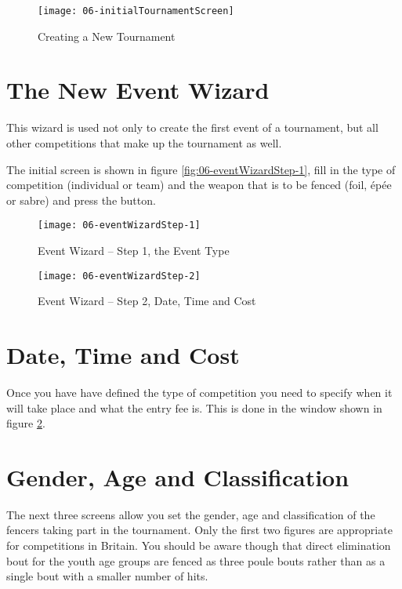 \documentclass[a4paper,11pt]{memoir}
\begin{document}
\begin{figure}
 \centering
 \texttt{[image: 06-initialTournamentScreen]}
 \caption{Creating a New Tournament} \label{fig:06-initialTournamentScreen}
\end{figure}

\section{The New Event Wizard}

This wizard is used not only to create the first event of a tournament, but all other competitions that make up the tournament as well.

The initial screen is shown in figure \ref{fig:06-eventWizardStep-1}, fill in the type of competition (individual or team) and the weapon that is to be fenced (foil, épée or sabre) and press the  button.

\begin{figure}[!ht]
 \centering
 \begin{minipage}{0.4\textwidth}
  \centering
  \texttt{[image: 06-eventWizardStep-1]}
  \caption{Event Wizard -- Step 1, the Event Type} \label{fig:06-eventWizardStep-1}
\end{minipage}
\hfill
 \begin{minipage}{0.4\textwidth}
  \centering
  \texttt{[image: 06-eventWizardStep-2]}
  \caption{Event Wizard -- Step 2, Date, Time and Cost} \label{fig:06-eventWizardStep-2}
\end{minipage}
\end{figure}

\section{Date, Time and Cost}

Once you have have defined the type of competition you need to specify when it will take place and what the entry fee is. This is done in the window shown in figure \ref{fig:06-eventWizardStep-2}.

\section{Gender, Age and Classification}

The next three screens allow you set the gender, age and classification of the fencers taking part in the tournament. Only the first two figures are appropriate for competitions in Britain. You should be aware though that direct elimination bout for the youth age groups are fenced as three poule bouts rather than as a single \gls{bout} with a smaller number of hits. 
\end{document}
